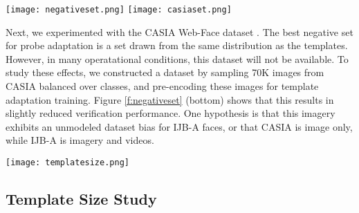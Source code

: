 \documentclass[10pt,twocolumn,letterpaper]{article}
\theoremstyle{definition}		\newtheorem{defn}[thm]{Definition}
\newcommand{\figwidth}{6.85in}
\begin{document}
\ifdefined\ECCV
\begin{figure*}[!t]
\begin{centering}
\texttt{[image: negativeset.png]} 
\texttt{[image: casiaset.png]} 
\caption{Negative Set Analysis.  We compare the effect of different negative sets for template adaptation.  (top) The best choice is using the other non-mated gallery templates to define the negative set.  (bottom) Experiments with a large unrelated negative set based on CASIA WebFaces results in slightly lowered performance.}
\label{f:negativeset}
\end{centering}
\end{figure*}
 \fi

Next, we experimented with the CASIA Web-Face dataset \cite{Yi14}.  The best negative set for probe adaptation is a set drawn from the same distribution as the templates.  However, in many operatational conditions, this dataset will not be available. 
To study these effects, 
we constructed a dataset by sampling 70K images from CASIA balanced over classes, and pre-encoding these images for template adaptation training.  Figure \ref{f:negativeset} (bottom) shows that this results in slightly reduced verification performance.  One hypothesis is that this imagery exhibits an unmodeled dataset bias for IJB-A faces, or that CASIA is image only, while IJB-A is imagery and videos. 

\ifdefined\ECCV
\begin{figure*}[t]
\begin{centering}
\texttt{[image: templatesize.png]} 
\caption{Template size analysis. (left) Similarity score increases as a function of maximum number of media, where the standard deviation is largest when template size is one. (right) True match rate as a function of maximum number of unique images or videos in a template pair, which shows that verification performance levels off at a maximum of {\em three} unique media per template.}
\label{f:template}
\end{centering}
\end{figure*}

 \fi











\subsection{Template Size Study}
\label{ss:templatesize}
\end{document}
